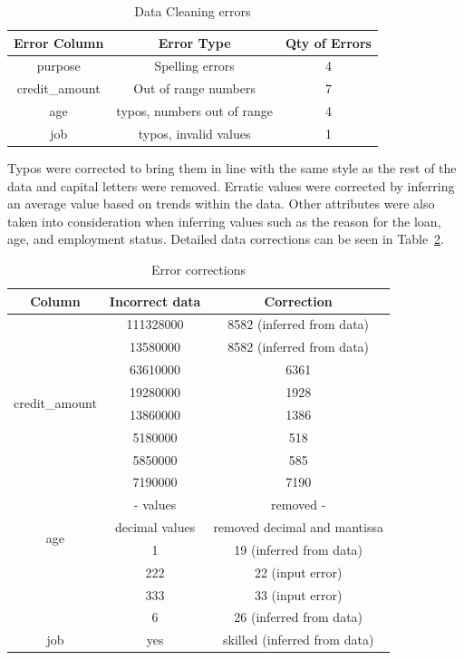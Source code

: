 \documentclass[12pt]{article}
\begin{document}
\begin{table}[h!]
\centering
\begin{tabular}{|c|c|c|}
\hline
\multicolumn{1}{|l|}{Error Column} & Error Type & \multicolumn{1}{r|}{Qty of Errors} \\ \hline
purpose & Spelling errors & 4 \\
credit\_amount & Out of range numbers & 7 \\
age & typos, numbers out of range & 4 \\
job & typos, invalid values & 1 \\ \hline
\end{tabular}
\caption{Data Cleaning errors}
\label{fig:data_cleaning}
\end{table}

Typos were corrected to bring them in line with the same style as the rest of the data and capital letters were removed. Erratic values were corrected by inferring an average value based on trends within the data. Other attributes were also taken into consideration when inferring values such as the reason for the loan, age, and employment status. Detailed data corrections can be seen in Table~\ref{fig:error_corrections}.

\begin{table}
\centering
\begin{tabular}{|c|c|c|}
\hline
Column & Incorrect data & Correction \\ \hline
\multirow{8}{*}{credit\_amount} & 111328000 & 8582 (inferred from data) \\
 & 13580000 & 8582 (inferred from data) \\
 & 63610000 & 6361 \\
 & 19280000 & 1928 \\
 & 13860000 & 1386 \\
 & 5180000 & 518 \\
 & 5850000 & 585 \\
 & 7190000 & 7190 \\ \hline
\multirow{4}{*}{age} & - values & removed - \\
 & decimal values & removed decimal and mantissa \\
 & 1 & 19 (inferred from data) \\
 & 222 & 22 (input error) \\
 & 333 & 33 (input error) \\
 & 6 & 26 (inferred from data) \\ \hline
job & yes & skilled (inferred from data) \\ \hline
\end{tabular}
\caption{Error corrections}
\label{fig:error_corrections}
\end{table}
\end{document}
